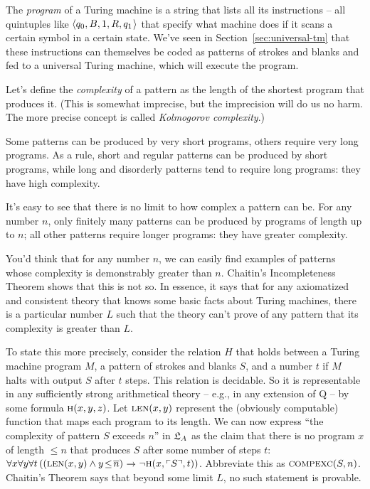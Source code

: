 The \emph{program} of a Turing machine is a string that lists all its instructions --
all quintuples like $\t{q_0, B, 1, R, q_1}$ that
specify what machine does if it scans a certain symbol in a certain state.
We've seen in Section~\ref{sec:universal-tm} that
these instructions can themselves be coded as patterns of strokes and blanks and fed to a universal Turing machine,
which will execute the program.

Let's define the \emph{complexity} of a pattern as the length of the shortest program that produces it.
(This is somewhat imprecise,
but the imprecision will do us no harm.
The more precise concept is called \emph{Kolmogorov complexity}.)
 
Some patterns can be produced by very short programs,
others require very long programs.
As a rule,
short and regular patterns can be produced by short programs,
while long and disorderly patterns tend to require long programs:
they have high complexity.

It's easy to see that
there is no limit to how complex a pattern can be.
For any number $n$,
only finitely many patterns can be produced by programs of length up to $n$;
all other patterns require longer programs:
they have greater complexity.

You'd think that for any number $n$,
we can easily find examples of patterns
whose complexity is demonstrably greater than $n$.
Chaitin's Incompleteness Theorem shows that this is not so.
In essence,
it says that
for any axiomatized and consistent theory
that knows some basic facts about Turing machines,
there is a particular number $L$ such that
the theory can't prove
of any pattern that its complexity is greater than $L$.

To state this more precisely,
consider the relation $H$ that holds between a Turing machine program $M$,
a pattern of strokes and blanks $S$,
and a number $t$ if
$M$ halts with output $S$ after $t$ steps.
This relation is decidable.
So it is representable in any sufficiently strong arithmetical theory
-- e.g., in any extension of Q --
by some formula $\smallcaps{H}(x,y,z)$.
Let $\smallcaps{Len}(x,y)$ represent the
(obviously computable) function that maps each program to its length.
We can now express ``the complexity of pattern $S$ exceeds $n$'' in $\mathfrak{L}_A$
as the claim that there is no program $x$ of length $\leq n$ that produces $S$ after some number of steps $t$:
$\forall x \forall y \forall t \, ((\smallcaps{len}(x,y) \land y \!\leq\! \num{n}) \,\to\, \neg \smallcaps{H}(x, \gn{S}, t))$.
Abbreviate this as $\smallcaps{CompExc}(S, n)$.
Chaitin's Theorem says that
beyond some limit $L$,
no such statement is provable.

